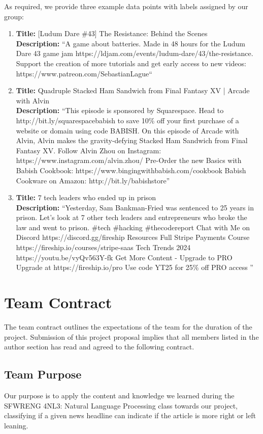 \documentclass[11pt]{article}
\begin{document}
As required, we provide three example data points with labels assigned by our group:
\begin{enumerate}
  \item \textbf{Title:} [Ludum Dare \#43] The Resistance: Behind the Scenes \\
    \textbf{Description:} ``A game about batteries. Made in 48 hours for the Ludum Dare 43 game jam https://ldjam.com/events/ludum-dare/43/the-resistance. Support the creation of more tutorials and get early access to new videos: https://www.patreon.com/SebastianLague``
  \item \textbf{Title:} Quadruple Stacked Ham Sandwich from Final Fantasy XV | Arcade with Alvin \\
    \textbf{Description:} ``This episode is sponsored by Squarespace. Head to http://bit.ly/squarespacebabish to save 10\% off your first purchase of a website or domain using code BABISH.
    On this episode of Arcade with Alvin, Alvin makes the gravity-defying Stacked Ham Sandwich from Final Fantasy XV.
    Follow Alvin Zhou on Instagram: https://www.instagram.com/alvin.zhou/
    Pre-Order the new Basics with Babish Cookbook: https://www.bingingwithbabish.com/cookbook
    Babish Cookware on Amazon: http://bit.ly/babishstore''
  \item \textbf{Title:} 7 tech leaders who ended up in prison \\
    \textbf{Description:} ``Yesterday, Sam Bankman-Fried was sentenced to 25 years in prison. Let's look at 7 other tech leaders and entrepreneurs who broke the law and went to prison.
    \#tech \#hacking \#thecodereport
    Chat with Me on Discord https://discord.gg/fireship
    Resources
    Full Stripe Payments Course https://fireship.io/courses/stripe-saas
    Tech Trends 2024 https://youtu.be/vyQv563Y-fk
    Get More Content - Upgrade to PRO
    Upgrade at https://fireship.io/pro
    Use code YT25 for 25\% off PRO access
'' 
\end{enumerate}


\section{Team Contract}
The team contract outlines the expectations of the team for the duration of the project. Submission of this project proposal implies that all members listed in the author section has read and agreed to the following contract.
\subsection{Team Purpose}
Our purpose is to apply the content and knowledge we learned during the SFWRENG 4NL3:
Natural Language Processing class towards our project, classifying if a given news headline can indicate if the article is more right or left leaning.
\end{document}

